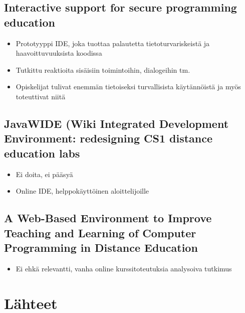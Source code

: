 \documentclass[11pt]{article}
\begin{document}
\subsection{Interactive support for secure programming education}
\begin{itemize}
\item Prototyyppi IDE, joka tuottaa palautetta tietoturvariskeistä ja
  haavoittuvuuksista koodissa
\item Tutkittu reaktioita sisäisiin toimintoihin, dialogeihin tm.
\item Opiskelijat tulivat enemmän tietoiseksi turvallisista
  käytännöistä ja myös toteuttivat niitä
\end{itemize}

\subsection{JavaWIDE (Wiki Integrated Development Environment: redesigning CS1 distance education labs}
\begin{itemize}
\item Ei doita, ei pääsyä
\item Online IDE, helppokäyttöinen aloittelijoille
\end{itemize}

\subsection{A Web-Based Environment to Improve Teaching and Learning of Computer Programming in Distance Education}
\begin{itemize}
\item Ei ehkä relevantti, vanha online kurssitoteutuksia analysoiva tutkimus
\end{itemize}


\section{Lähteet}
\label{sec:orgb7e844c}
\end{document}
